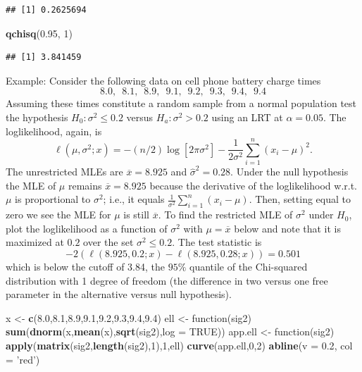 \documentclass[]{book}
\newenvironment{Shaded}{\begin{snugshade}}{\end{snugshade}}
\newcommand{\KeywordTok}[1]{\textcolor[rgb]{0.13,0.29,0.53}{\textbf{{#1}}}}
\newcommand{\DataTypeTok}[1]{\textcolor[rgb]{0.13,0.29,0.53}{{#1}}}
\newcommand{\DecValTok}[1]{\textcolor[rgb]{0.00,0.00,0.81}{{#1}}}
\newcommand{\FloatTok}[1]{\textcolor[rgb]{0.00,0.00,0.81}{{#1}}}
\newcommand{\StringTok}[1]{\textcolor[rgb]{0.31,0.60,0.02}{{#1}}}
\newcommand{\OtherTok}[1]{\textcolor[rgb]{0.56,0.35,0.01}{{#1}}}
\newcommand{\NormalTok}[1]{{#1}}
\begin{document}
\begin{verbatim}
## [1] 0.2625694
\end{verbatim}

\begin{Shaded}
\begin{Highlighting}[]
\KeywordTok{qchisq}\NormalTok{(}\FloatTok{0.95}\NormalTok{, }\DecValTok{1}\NormalTok{)}
\end{Highlighting}
\end{Shaded}

\begin{verbatim}
## [1] 3.841459
\end{verbatim}

 Example: Consider the following data on cell phone battery charge times
\[8.0, \,\,\, 8.1, \,\,\, 8.9, \,\,\, 9.1, \,\,\, 9.2, \,\,\, 9.3, \,\,\, 9.4, \,\,\, 9.4\]
Assuming these times constitute a random sample from a normal population
test the hypothesis \(H_0:\sigma^2 \leq 0.2\) versus
\(H_a:\sigma^2 > 0.2\) using an LRT at \(\alpha = 0.05\). The
loglikelihood, again, is
\[\ell(\mu, \sigma^2; x) = -(n/2)\log [2\pi\sigma^2] - \frac{1}{2\sigma^2}\sum_{i=1}^n(x_i - \mu)^2.\]
The unrestricted MLEs are \(\overline x = 8.925\) and
\(\hat\sigma^2 = 0.28\). Under the null hypothesis the MLE of \(\mu\)
remains \(\overline x = 8.925\) because the derivative of the
loglikelihood w.r.t. \(\mu\) is proportional to \(\sigma^2\); i.e., it
equals \(\frac{1}{\sigma^2}\sum_{i=1}^n (x_i - \mu)\). Then, setting
equal to zero we see the MLE for \(\mu\) is still \(\overline x\). To
find the restricted MLE of \(\sigma^2\) under \(H_0\), plot the
loglikelihood as a function of \(\sigma^2\) with \(\mu = \overline x\)
below and note that it is maximized at \(0.2\) over the set
\(\sigma^2 \leq 0.2\). The test statistic is
\[-2(\ell(8.925,0.2;x) - \ell(8.925,0.28;x)) = 0.501\] which is below
the cutoff of 3.84, the \(95\%\) quantile of the Chi-squared
distribution with 1 degree of freedom (the difference in two versus one
free parameter in the alternative versus null hypothesis).

\begin{Shaded}
\begin{Highlighting}[]
\NormalTok{x <-}\StringTok{ }\KeywordTok{c}\NormalTok{(}\FloatTok{8.0}\NormalTok{,}\FloatTok{8.1}\NormalTok{,}\FloatTok{8.9}\NormalTok{,}\FloatTok{9.1}\NormalTok{,}\FloatTok{9.2}\NormalTok{,}\FloatTok{9.3}\NormalTok{,}\FloatTok{9.4}\NormalTok{,}\FloatTok{9.4}\NormalTok{)}
\NormalTok{ell <-}\StringTok{ }\NormalTok{function(sig2) }\KeywordTok{sum}\NormalTok{(}\KeywordTok{dnorm}\NormalTok{(x,}\KeywordTok{mean}\NormalTok{(x),}\KeywordTok{sqrt}\NormalTok{(sig2),}\DataTypeTok{log =} \OtherTok{TRUE}\NormalTok{))}
\NormalTok{app.ell <-}\StringTok{ }\NormalTok{function(sig2) }\KeywordTok{apply}\NormalTok{(}\KeywordTok{matrix}\NormalTok{(sig2,}\KeywordTok{length}\NormalTok{(sig2),}\DecValTok{1}\NormalTok{),}\DecValTok{1}\NormalTok{,ell)}
\KeywordTok{curve}\NormalTok{(app.ell,}\DecValTok{0}\NormalTok{,}\DecValTok{2}\NormalTok{)  }
\KeywordTok{abline}\NormalTok{(}\DataTypeTok{v =} \FloatTok{0.2}\NormalTok{, }\DataTypeTok{col =} \StringTok{'red'}\NormalTok{)}
\end{Highlighting}
\end{Shaded}
\end{document}
